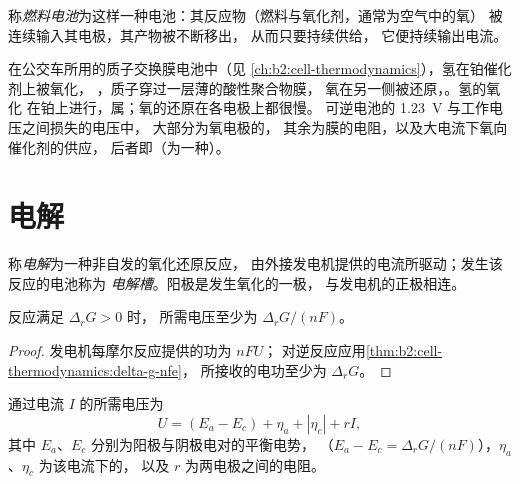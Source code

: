 \begin{definition}[燃料电池]\label{def:b2:batteries-electrolysis:fuel-cell}
称\emph{燃料电池}为这样一种电池：其反应物（燃料与氧化剂，通常为空气中的氧）
被连续输入其电极，其产物被不断移出，
从而只要持续供给，
它便持续输出电流。
\end{definition}

在公交车所用的质子交换膜电池中（见
\cref{ch:b2:cell-thermodynamics}），氢在铂催化剂上被氧化，
，质子穿过一层薄的酸性聚合物膜，
氧在另一侧被还原，。氢的氧化
在铂上进行，属；氧的还原在各电极上都很慢。
可逆电池的 \qty{1.23}{V} 与工作电压之间损失的电压中，
大部分为氧电极的，
其余为膜的电阻，以及大电流下氧向催化剂的供应，
后者即（为一种）。

\section{电解}

\begin{definition}[电解]\label{def:b2:batteries-electrolysis:electrolysis}
称\emph{电解}为一种非自发的氧化还原反应，
由外接发电机提供的电流所驱动；发生该反应的电池称为
\emph{电解槽}。阳极是发生氧化的一极，
与发电机的正极相连。
\end{definition}

\begin{proposition}[热力学最小电压]\label{prop:b2:batteries-electrolysis:minimum-voltage}
反应满足 $\Delta_r G > 0$ 时，
所需电压至少为 $\Delta_r G/(nF)$。
\end{proposition}

\begin{proof}
发电机每摩尔反应提供的功为 $nFU$；
对逆反应应用\cref{thm:b2:cell-thermodynamics:delta-g-nfe}，
所接收的电功至少为 $\Delta_r G$。
\end{proof}

\begin{proposition}[电解槽的电压]\label{prop:b2:batteries-electrolysis:electrolysis-voltage}
通过电流 $I$ 的所需电压为
\[
  U = (E_a - E_c) + \eta_a + |\eta_c| + rI ,
\]
其中 $E_a$、$E_c$ 分别为阳极与阴极电对的平衡电势，
（$E_a - E_c = \Delta_r G/(nF)$），$\eta_a$、$\eta_c$ 为该电流下的，
以及 $r$ 为两电极之间的电阻。
\end{proposition}


